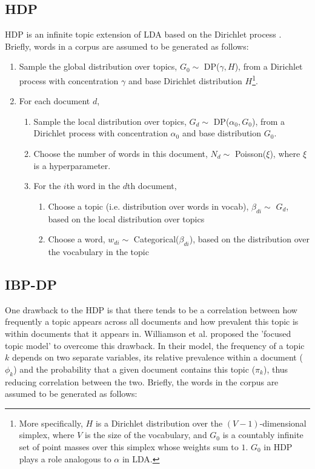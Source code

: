 \documentclass{article}
\begin{document}
\subsection{HDP}
\label{HDP-details}
HDP is an infinite topic extension of LDA based on the Dirichlet process \cite{HDP}. Briefly, words in a corpus are assumed to be generated as follows:
\begin{enumerate}
\item Sample the global distribution over topics, $G_0 \sim$ DP($\gamma, H$), from a Dirichlet process with concentration $\gamma$ and base Dirichlet distribution $H$\footnote{More specifically, $H$ is a Dirichlet distribution over the $(V-1)$-dimensional simplex, where $V$ is the size of the vocabulary, and $G_0$ is a countably infinite set of point masses over this simplex whose weights sum to $1$. $G_0$ in HDP plays a role analogous to $\alpha$ in LDA.}. 
\item For each document $d$,
\begin{enumerate}
\item Sample the local distribution over topics, $G_d \sim$ DP($\alpha_0, G_0$), from a Dirichlet process with concentration $\alpha_0$ and base distribution $G_0$.
\item Choose the number of words in this document, $N_d \sim$ Poisson($\xi$), where $\xi$ is a hyperparameter.
\item For the $i$th word in the $d$th document,
\begin{enumerate}
\item Choose a topic (i.e. distribution over words in vocab), $\beta_{di} \sim$ $G_d$, based on the local distribution over topics
\item Choose a word, $w_{di} \sim$ Categorical($\beta_{di}$), based on the distribution over the vocabulary in the topic
\end{enumerate}
\end{enumerate}
\end{enumerate}

\subsection{IBP-DP}
\label{IBP-details}
One drawback to the HDP is that there tends to be a correlation between how frequently a topic appears across all documents and how prevalent this topic is within documents that it appears in. Williamson et al. \cite{IBP} proposed the 'focused topic model' to overcome this drawback. In their model, the frequency of a topic $k$ depends on two separate variables, its relative prevalence within a document ($\phi_k$) and the probability that a given document contains this topic ($\pi_k$), thus reducing correlation between the two. Briefly, the words in the corpus are assumed to be generated as follows:
\end{document}
